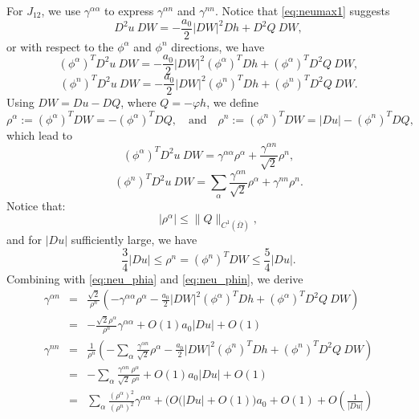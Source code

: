 \documentclass[12pt]{article}
\numberwithin{equation}{section}
\theoremstyle{plain}
\theoremstyle{definition}
\theoremstyle{remark}
\begin{document}
For $J_{12}$, we use $\gamma^{\alpha \alpha}$ to express $\gamma^{\alpha n}$ and $\gamma^{n n}$. Notice that \eqref{eq:neumax1} suggests
\begin{equation*}
    D^2 u \ DW = - \frac{a_0}{2} |DW|^2 Dh + D^2 Q \ DW,
\end{equation*}
or with respect to the $\phi^{\alpha}$ and $\phi^n$ directions, we have
\begin{equation} \label{eq:neu_phia}
    (\phi^{\alpha})^T D^2 u \ DW = - \frac{a_0}{2} |DW|^2 (\phi^{\alpha})^T Dh + (\phi^{\alpha})^T D^2 Q \ DW,
\end{equation}
\begin{equation} \label{eq:neu_phin}
    (\phi^n)^T D^2 u \ DW = - \frac{a_0}{2} |DW|^2 (\phi^n)^T Dh + (\phi^n)^T D^2 Q \ DW.
\end{equation}
Using $DW = Du - DQ$, where $Q =- \varphi h $, we define
\begin{equation} \label{eq:neu_rho_def}
\rho^{\alpha} := (\phi^{\alpha})^T DW = - (\phi^{\alpha})^T DQ,
\quad\text{and}\quad
\rho^n := (\phi^n)^T DW = |Du| - (\phi^n)^T DQ ,
\end{equation}
which lead to
 \begin{equation} \label{eq:neu_phi_rhoa}
    (\phi^{\alpha})^T D^2 u \ DW = \gamma^{\alpha \alpha} \rho^{\alpha} + \frac{ \gamma^{\alpha n} }{\sqrt{2}} \rho^n ,
\end{equation}
\begin{equation} \label{eq:neu_phi_rhon}
    (\phi^n)^T D^2 u \ DW = \sum_{\alpha} \frac{ \gamma^{\alpha n} }{\sqrt{2}} \rho^{\alpha}  + \gamma^{n n} \rho^n .
\end{equation}
Notice that:
\begin{equation} \label{eq:neu_rhoa}
    |\rho^{\alpha}| \leq \| Q  \|_{C^1(\overline{\Omega})},
\end{equation}
and for $|Du|$ sufficiently large, we have
\begin{equation} \label{eq:neu_rhon}
    \frac{3}{4} |Du| \leq \rho^n = (\phi^n)^T DW \leq \frac{5}{4} |Du|.
\end{equation}
Combining with \eqref{eq:neu_phia} and \eqref{eq:neu_phin}, we derive
\begin{eqnarray*}
    \gamma^{\alpha n} & = & \frac{\sqrt{2}}{\rho^n} \left( -\gamma^{\alpha \alpha} \rho^{\alpha}  - \frac{a_0}{2} |DW|^2 (\phi^{\alpha})^T Dh + (\phi^{\alpha})^T D^2 Q \ DW  \right) \\
    & = & - \frac{\sqrt{2} \rho^{\alpha}}{\rho^n} \gamma^{\alpha \alpha} + O(1) a_0 |Du| + O(1) \\
    \gamma^{n n} & = & \frac{1}{\rho^n} \left( -\sum_{\alpha} \frac{ \gamma^{\alpha n} }{\sqrt{2}} \rho^{\alpha}  - \frac{a_0}{2} |DW|^2 (\phi^n)^T Dh + (\phi^n)^T D^2 Q \ DW  \right) \\
    & = & -\sum_{\alpha} \frac{ \gamma^{\alpha n} \  \rho^{\alpha} }{\sqrt{2} \ \rho^n } + O(1) a_0 |Du| + O(1) \\
    & = & \sum_{\alpha} \frac{(\rho^{\alpha})^2}{ (\rho^n)^2 } \gamma^{\alpha \alpha} + \big( O(|Du| + O(1) \big) a_0 + O(1) + O\left( \frac{1}{|Du|} \right)
\end{eqnarray*}
\end{document}
